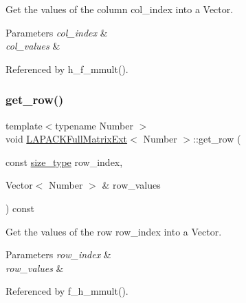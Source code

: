 Get the values of the column {\ttfamily col\+\_\+index} into a {\ttfamily Vector}. 
\begin{DoxyParams}{Parameters}
{\em col\+\_\+index} & \\
\hline
{\em col\+\_\+values} & \\
\hline
\end{DoxyParams}


Referenced by h\+\_\+f\+\_\+mmult().

\mbox{\label{classLAPACKFullMatrixExt_abc010374ccacc6d1e482196af807d247}} 
\subsubsection{\texorpdfstring{get\+\_\+row()}{get\_row()}}
{\footnotesize\ttfamily template$<$typename Number $>$ \\
void \hyperlink{classLAPACKFullMatrixExt}{L\+A\+P\+A\+C\+K\+Full\+Matrix\+Ext}$<$ Number $>$\+::get\+\_\+row (\begin{DoxyParamCaption}\item[{const \hyperlink{classLAPACKFullMatrixExt_a5cf5f4a6104dc17029210b5ca52bf574}{size\+\_\+type}}]{row\+\_\+index,  }\item[{Vector$<$ Number $>$ \&}]{row\+\_\+values }\end{DoxyParamCaption}) const}

Get the values of the row {\ttfamily row\+\_\+index} into a {\ttfamily Vector}. 
\begin{DoxyParams}{Parameters}
{\em row\+\_\+index} & \\
\hline
{\em row\+\_\+values} & \\
\hline
\end{DoxyParams}


Referenced by f\+\_\+h\+\_\+mmult().

\mbox{\label{classLAPACKFullMatrixExt_aeeae2d2698007889a47f192043adb75c}} 
